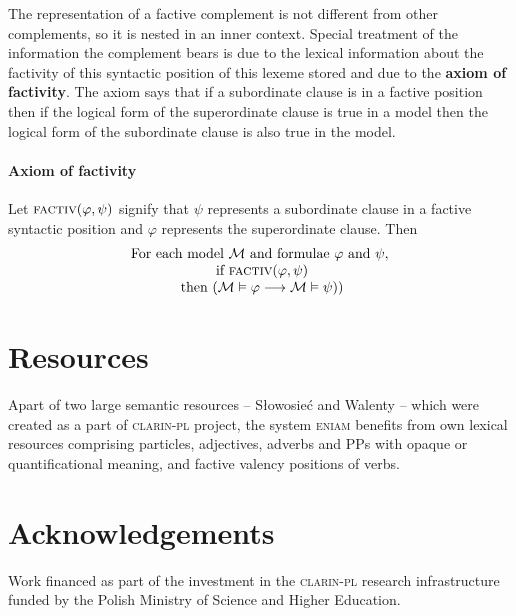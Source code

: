 \documentclass[11pt]{article}
\newcommand{\pred}[1]{\text{{\sc #1}}}
\begin{document}
The representation of a factive complement is not different from other complements, so it is nested in an inner context. Special treatment of the information the complement bears is due to the lexical information about the factivity of this syntactic position of this lexeme stored and due to the \textbf{axiom of factivity}. The axiom says that if a subordinate clause is in a factive position then if the logical form of the superordinate clause is true in a model then the logical form of the subordinate clause is also true in the model.

\paragraph{Axiom of factivity}\label{ax_fact}
Let $\pred{factiv}(\varphi, \psi)$ signify that
 $\psi$ 
represents a subordinate clause in a factive syntactic position 
and
$\varphi$
represents
the superordinate clause.
Then
\begin{multline}
\begin{array}{c}
\text{For each model }
{\cal M} \text{ and formulae }
\varphi \text{ and }
 \psi, \\
 \text{ if }
\pred{factiv}(\varphi, \psi) \\
\text{ then }
({\cal M} \vDash \varphi
\longrightarrow
{\cal M} \vDash \psi)
)
\end{array}
\end{multline}





\section{Resources}
Apart of two large semantic resources -- Słowosieć and Walenty -- which were created as a part of \textsc{clarin-pl} project,
the system \textsc{eniam} benefits from own lexical resources comprising particles, adjectives, adverbs and PPs with opaque or quantificational meaning, and factive valency positions of verbs.

\section*{Acknowledgements}
Work financed as part of the investment in the \textsc{clarin-pl} research infrastructure funded by the Polish Ministry of Science and Higher Education.



\end{document}
